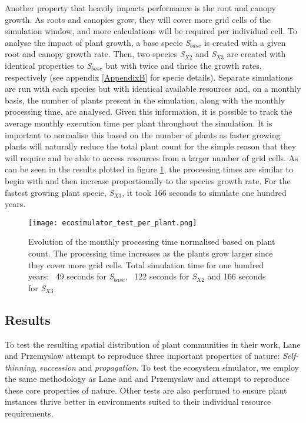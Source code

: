 Another property that heavily impacts performance is the root and canopy growth. As roots and canopies grow, they will cover more grid cells of the simulation window, and more calculations will be required per individual cell. To analyse the impact of plant growth, a base specie \textit{S$_{base}$} is created with a given root and canopy growth rate. Then, two species \textit{S$_{X2}$} and \textit{S$_{X3}$} are created with identical properties to \textit{S$_{base}$} but with twice and thrice the growth rates, respectively (see appendix \ref{AppendixB} for specie details). Separate simulations are run with each species but with identical available resources and, on a monthly basis, the number of plants present in the simulation, along with the monthly processing time, are analysed. Given this information, it is possible to track the average monthly execution time per plant throughout the simulation. It is important to normalise this based on the number of plants as faster growing plants will naturally reduce the total plant count for the simple reason that they will require and be able to access resources from a larger number of grid cells. As can be seen in the results plotted in figure \ref{fig:ecosimulator_test_per_plant}, the processing times are similar to begin with and then increase proportionally to the species growth rate. For the fastest growing plant specie, \textit{S$_{X3}$}, it took 166 seconds to simulate one hundred years.

\begin{figure}
\center
	\texttt{[image: ecosimulator\_test\_per\_plant.png]}
	\caption{ Evolution of the monthly processing time normalised based on plant count. The processing time increases as the plants grow larger since they cover more grid cells. Total simulation time for one hundred years: ~49 seconds for \textit{S$_{base}$}, ~122 seconds for \textit{S$_{X2}$} and 166 seconds for \textit{S$_{X3}$}}
	\label{fig:ecosimulator_test_per_plant}
\end{figure}

\subsection{Results} \label{subsec:ecosystem_simulator_results}

To test the resulting spatial distribution of plant communities in their work, Lane and Przemyslaw \cite{Lane2002} attempt to reproduce three important properties of nature: \textit{Self-thinning}, \textit{succession} and \textit{propagation}. To test the ecosystem simulator, we employ the same methodology as Lane and and Przemyslaw \cite{Lane2002} and attempt to reproduce these core properties of nature. Other tests are also performed to ensure plant instances thrive better in environments suited to their individual resource requirements.\\


